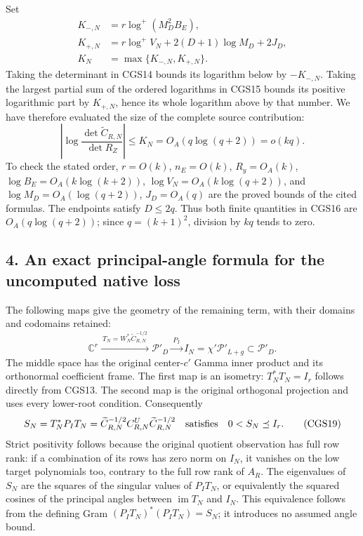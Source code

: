 \documentclass[11pt]{article}
\begin{document}
Set \[
\begin{split}
K_{-,N}&=r\log^+(M_D^2B_E),\\
K_{+,N}&=r\log^+V_N+2(D+1)\log M_D+2J_D,\\
K_N&=\max\{K_{-,N},K_{+,N}\}.
\end{split}\tag{CGS16}
\] Taking the determinant in CGS14 bounds its logarithm below by \(-K_{-,N}\). Taking the largest partial sum of the ordered logarithms in CGS15 bounds its positive logarithmic part by \(K_{+,N}\), hence its whole logarithm above by that number. We have therefore evaluated the size of the complete source contribution: \[
\boxed{\left|\log\frac{\det\widetilde C_{R,N}}{\det R_Z}\right|
\le K_N=O_A(q\log(q+2))=o(kq).}
\tag{CGS17}
\] To check the stated order, \(r=O(k)\), \(n_E=O(k)\), \(R_y=O_A(k)\), \(\log B_E=O_A(k\log(k+2))\), \(\log V_N=O_A(k\log(q+2))\), and \(\log M_D=O_A(\log(q+2))\), \(J_D=O_A(q)\) are the proved bounds of the cited formulas. The endpoints satisfy \(D\le2q\). Thus both finite quantities in CGS16 are \(O_A(q\log(q+2))\); since \(q=(k+1)^2\), division by \(kq\) tends to zero.

\subsection{4. An exact principal-angle formula for the uncomputed native loss}\label{an-exact-principal-angle-formula-for-the-uncomputed-native-loss}

The following maps give the geometry of the remaining term, with their domains and codomains retained: \[
\mathbb C^r\xrightarrow{\ T_N=W_N^*\widetilde C_{R,N}^{-1/2}\ }
\mathcal P'_D\xrightarrow{\ P_I\ }
I_N=\chi'\mathcal P'_{L+g}\subset\mathcal P'_D.
\tag{CGS18}
\] The middle space has the original center-\(c'\) Gamma inner product and its orthonormal coefficient frame. The first map is an isometry: \(T_N^*T_N=I_r\) follows directly from CGS13. The second map is the original orthogonal projection and uses every lower-root condition. Consequently \[
S_N=T_N^*P_IT_N
=\widetilde C_{R,N}^{-1/2}C_{R,N}^U
                   \widetilde C_{R,N}^{-1/2}
\quad\hbox{satisfies}\quad 0<S_N\preceq I_r.
\tag{CGS19}
\] Strict positivity follows because the original quotient observation has full row rank: if a combination of its rows has zero norm on \(I_N\), it vanishes on the low target polynomials too, contrary to the full row rank of \(A_R\). The eigenvalues of \(S_N\) are the squares of the singular values of \(P_IT_N\), or equivalently the squared cosines of the principal angles between \(\operatorname{im}T_N\) and \(I_N\). This equivalence follows from the defining Gram \((P_IT_N)^*(P_IT_N)=S_N\); it introduces no assumed angle bound.
\end{document}
